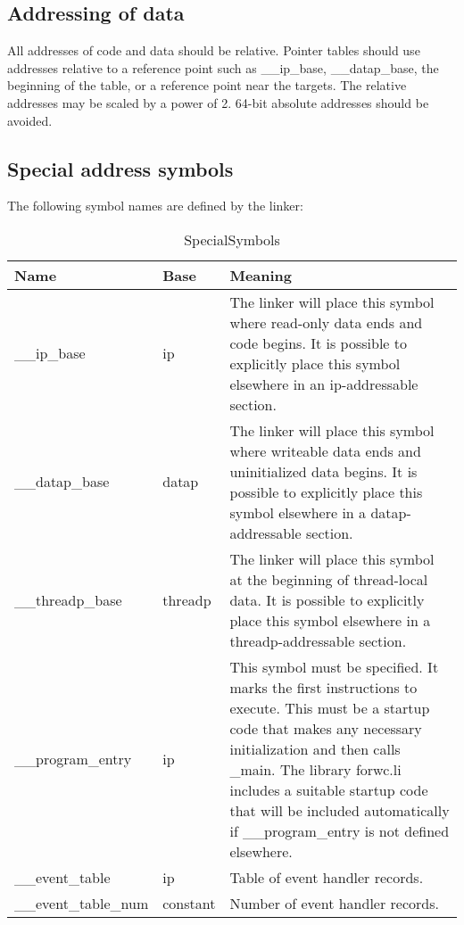 \documentclass[forwardcom.tex]{subfiles}
\begin{document}
\subsection{Addressing of data} \label{AddressingOfData}
All addresses of code and data should be relative. Pointer tables should use addresses 
relative to a reference point such as \_\_ip\_base, \_\_datap\_base, the beginning of the table,
or a reference point near the targets. The relative addresses may be scaled by a power of 2. 
64-bit absolute addresses should be avoided.
\vspace{2mm}

\subsection{Special address symbols} \label{SpecialAddressSymbols}
The following symbol names are defined by the linker:

\begin{longtable} {|p{28mm}|p{12mm}|p{95mm}|}
\caption{SpecialSymbols} 
\label{table:specialSymbols}\\
\endfirsthead
\endhead
\hline
\bfseries Name & \bfseries Base & \bfseries Meaning  \\
\hline
\_\_ip\_base & ip & The linker will place this symbol where read-only data ends and code begins. 
It is possible to explicitly place this symbol elsewhere in an ip-addressable section.\\
\hline
\_\_datap\_base & datap & The linker will place this symbol where writeable data ends and uninitialized data begins. 
It is possible to explicitly place this symbol elsewhere in a datap-addressable section.\\
\hline
\_\_threadp\_base & threadp & The linker will place this symbol at the beginning of thread-local data. 
It is possible to explicitly place this symbol elsewhere in a threadp-addressable section.\\
\hline
\_\_program\_entry & ip & This symbol must be specified. It marks the first instructions to execute. 
This must be a startup code that makes any necessary initialization and then calls \_main.
The library forwc.li includes a suitable startup code that will be included automatically
if \_\_program\_entry is not defined elsewhere.\\
\hline
\_\_event\_table & ip & Table of event handler records.\\
\hline
\_\_event\_table\_num & constant & Number of event handler records.\\
\hline
\end{longtable}
\end{document}
